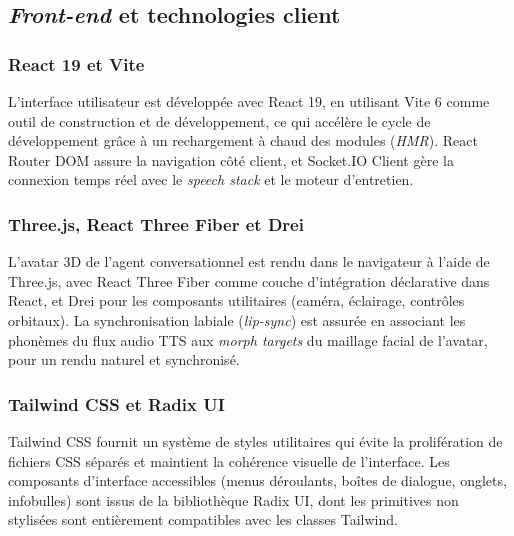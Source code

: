 

\subsection{\textit{Front-end} et technologies client}

\subsubsection{React 19 et Vite}

L'interface utilisateur est développée avec React 19, en utilisant Vite 6 comme outil de construction et de développement, ce qui accélère le cycle de développement grâce à un rechargement à chaud des modules (\textit{HMR}). React Router DOM assure la navigation côté client, et Socket.IO Client gère la connexion temps réel avec le \textit{speech stack} et le moteur d'entretien.


\subsubsection{Three.js, React Three Fiber et Drei}

L'avatar 3D de l'agent conversationnel est rendu dans le navigateur à l'aide de Three.js, avec React Three Fiber comme couche d'intégration déclarative dans React, et Drei pour les composants utilitaires (caméra, éclairage, contrôles orbitaux). La synchronisation labiale (\textit{lip-sync}) est assurée en associant les phonèmes du flux audio TTS aux \textit{morph targets} du maillage facial de l'avatar, pour un rendu naturel et synchronisé.


\subsubsection{Tailwind CSS et Radix UI}

Tailwind CSS fournit un système de styles utilitaires qui évite la prolifération de fichiers CSS séparés et maintient la cohérence visuelle de l'interface. Les composants d'interface accessibles (menus déroulants, boîtes de dialogue, onglets, infobulles) sont issus de la bibliothèque Radix UI, dont les primitives non stylisées sont entièrement compatibles avec les classes Tailwind.


